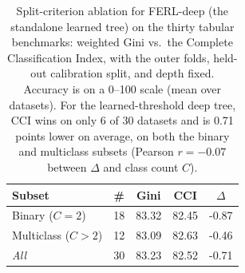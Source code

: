 \begin{table}[t]
\centering
\small
\caption{Split-criterion ablation for FERL-deep (the standalone learned tree) on the thirty tabular benchmarks: weighted Gini vs.\ the Complete Classification Index, with the outer folds, held-out calibration split, and depth fixed. Accuracy is on a 0--100 scale (mean over datasets). For the learned-threshold deep tree, CCI wins on only 6 of $30$ datasets and is 0.71 points lower on average, on both the binary and multiclass subsets (Pearson $r{=}-0.07$ between $\Delta$ and class count $C$).}
\label{tab:cci-gini-learned}
\begin{tabular}{@{}lcccc@{}}
\toprule
Subset & \# & Gini & CCI & $\Delta$\\
\midrule
Binary ($C{=}2$) & 18 & 83.32 & 82.45 & -0.87\\
Multiclass ($C{>}2$) & 12 & 83.09 & 82.63 & -0.46\\
\midrule
\emph{All} & 30 & 83.23 & 82.52 & -0.71\\
\bottomrule
\end{tabular}
\end{table}
